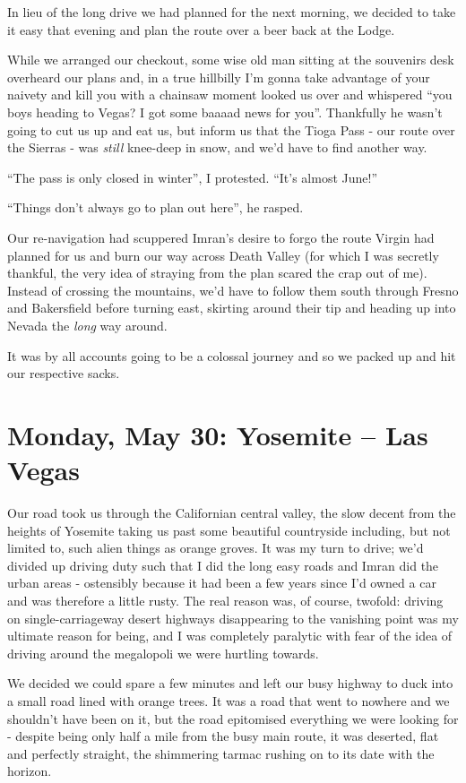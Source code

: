 \documentclass[a5paper,titlepage,11pt]{book}
\begin{document}
In lieu of the long drive we had planned for the next morning, we decided to take it easy that evening and plan the route over a beer back at the Lodge.

While we arranged our checkout, some wise old man sitting at the souvenirs desk overheard our plans and, in a true hillbilly I'm gonna take advantage of your naivety and kill you with a chainsaw moment looked us over and whispered ``you boys heading to Vegas? I got some baaaad news for you''.  Thankfully he wasn't going to cut us up and eat us, but inform us that the Tioga Pass - our route over the Sierras - was \emph{still} knee-deep in snow, and we'd have to find another way.

``The pass is only closed in winter'', I protested.  ``It's almost June!''

``Things don't always go to plan out here'', he rasped.

Our re-navigation had scuppered Imran's desire to forgo the route Virgin had planned for us and burn our way across Death Valley (for which I was secretly thankful, the very idea of straying from the plan scared the crap out of me).  Instead of crossing the mountains, we'd have to follow them south through Fresno and Bakersfield before turning east, skirting around their tip and heading up into Nevada the \emph{long} way around.

It was by all accounts going to be a colossal journey and so we packed up and hit our respective sacks.

\chapter[Yosemite -- Las Vegas]{Monday, May 30: Yosemite -- Las Vegas}
Our road took us through the Californian central valley, the slow decent from the heights of Yosemite taking us past some beautiful countryside including, but not limited to, such alien things as orange groves.  It was my turn to drive; we'd divided up driving duty such that I did the long easy roads and Imran did the urban areas - ostensibly because it had been a few years since I'd owned a car and was therefore a little rusty.  The real reason was, of course, twofold: driving on single-carriageway desert highways disappearing to the vanishing point was my ultimate reason for being, and I was completely paralytic with fear of the idea of driving around the megalopoli we were hurtling towards.

We decided we could spare a few minutes and left our busy highway to duck into a small road lined with orange trees.  It was a road that went to nowhere and we shouldn't have been on it, but the road epitomised everything we were looking for - despite being only half a mile from the busy main route, it was deserted, flat and perfectly straight, the shimmering tarmac rushing on to its date with the horizon.
\end{document}

